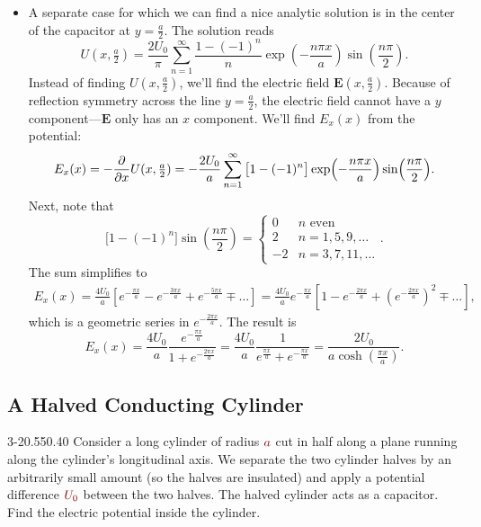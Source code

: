 \documentclass[11pt, a4paper]{article}
\newcommand{\dmath}[1]{\textcolor{Maroon}{#1}}  %
\renewcommand{\vec}[1]{\bm{#1}} %
\newcommand{\E}{\vec{E}}  %
\newcommand{\defaultQuestionWidth}{0.55}
\newcommand{\defaultGraphicsWidth}{0.40}
\begin{document}
\begin{itemize}
	\item A separate case for which we can find a nice analytic solution is in the center of the capacitor at $ y = \frac{a}{2} $. The solution reads
	\begin{equation*}
		U(x, \tfrac{a}{2}) = \frac{2U_{0}}{\pi} \sum_{n = 1}^{\infty}\frac{1 - (-1)^{n}}{n}\exp(-\frac{n\pi x}{a}) \sin(\frac{n\pi}{2}).
	\end{equation*}
	Instead of finding $ U(x, \tfrac{a}{2}) $, we'll find the electric field $ \E(x, \tfrac{a}{2}) $. Because of reflection symmetry across the line $ y = \frac{a}{2} $, the electric field cannot have a $ y $ component---$ \E $ only has an $ x $ component. We'll find $ E_{x}(x) $ from the potential:
	\begin{equation*}
		E_{x}(x) = -\pdv{}{x}U(x, \tfrac{a}{2}) = -\frac{2U_{0}}{a} \sum_{n = 1}^{\infty}\big[1 - (-1)^{n}\big]\exp(-\frac{n\pi x}{a}) \sin(\frac{n\pi}{2}).
	\end{equation*}
	Next, note that
	\begin{equation*}
		\big[1 - (-1)^{n}\big]\sin(\frac{n\pi}{2}) = 
		\begin{cases}
			0 & n \text{ even}\\
			2 & n = 1, 5, 9, \ldots\\
			- 2 & n = 3, 7, 11, \ldots
		\end{cases}.
	\end{equation*}
	The sum simplifies to
	\begin{align*}
		E_{x}(x) = \frac{4U_{0}}{a}\left[e^{-\frac{\pi x}{a}} - e^{-\frac{3\pi x}{a}} + e^{-\frac{5\pi x}{a}} \mp \ldots \right] = \frac{4U_{0}}{a}e^{-\frac{\pi x}{a}}\left[1 - e^{-\frac{2\pi x}{a}} + \left(e^{-\frac{2\pi x}{a}}\right)^{2}\mp \ldots \right],
	\end{align*}
	which is a geometric series in $ e^{-\frac{2\pi x}{a}} $. The result is
	\begin{equation*}
		E_{x}(x) =  \frac{4U_{0}}{a}\frac{e^{-\frac{\pi x}{a}}}{1 + e^{-\frac{2\pi x}{a}}} = \frac{4U_{0}}{a}\frac{1}{e^{\frac{\pi x}{a}} + e^{-\frac{\pi x}{a}}} = \frac{2U_{0}}{a\cosh(\frac{\pi x}{a})}.
	\end{equation*}
\end{itemize}

\subsection{A Halved Conducting Cylinder}
\begin{figurequestion}{3-2}{\defaultQuestionWidth}{\defaultGraphicsWidth}
Consider a long cylinder of radius $ \dmath{a} $ cut in half along a plane running along the cylinder's longitudinal axis. We separate the two cylinder halves by an arbitrarily small amount (so the halves are insulated) and apply a potential difference $ \dmath{U_{0}} $ between the two halves. The halved cylinder acts as a capacitor. Find the electric potential inside the cylinder.
\end{figurequestion}
\end{document}
